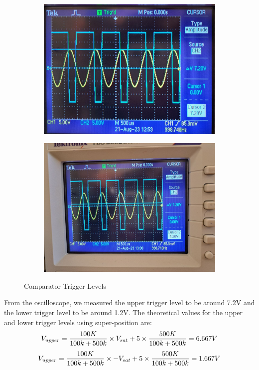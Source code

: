 \documentclass[12pt]{article}
\begin{document}
\begin{figure}[H]
    \begin{subfigure}[b]{0.49\textwidth}
        \centering
        \includegraphics[width=\textwidth]{assets//main/2023-08-27-20-03-47.png}
    \end{subfigure}
    \begin{subfigure}[b]{0.49\textwidth}
        \centering
        \includegraphics[width=\textwidth]{assets//main/2023-08-27-20-04-03.png}
    \end{subfigure}
    \caption{Comparator Trigger Levels}
\end{figure}
From the oscilloscope, we measured the upper trigger level to be around 7.2V and the lower trigger level to be around 1.2V. The theoretical values for the upper and lower trigger levels using super-position are:
\begin{equation}
    V_{upper} = {100K \over 100k + 500k}\times V_{sat} + 5 \times {500K \over 100k + 500k}= 6.667V
\end{equation}
\begin{equation}
    V_{upper} = {100K \over 100k + 500k}\times -V_{sat} + 5 \times {500K \over 100k + 500k}= 1.667V
\end{equation}
\end{document}
